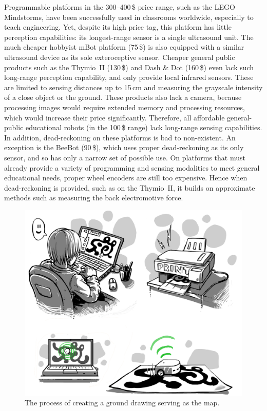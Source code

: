 \documentclass[letterpaper, 10pt, conference]{ieeeconf}
\begin{document}
Programmable platforms in the 300--400\,\$ price range, such as the LEGO Mindstorms, have been successfully used in classrooms worldwide, especially to teach engineering.
Yet, despite its high price tag, this platform has little perception capabilities: its longest-range sensor is a single ultrasound unit.
The much cheaper hobbyist mBot platform (75\,\$) is also equipped with a similar ultrasound device as its sole exteroceptive sensor.
Cheaper general public products such as the Thymio~II (130\,\$) and Dash \& Dot (160\,\$) even lack such long-range perception capability, and only provide local infrared sensors.
These are limited to sensing distances up to 15\,cm and measuring the grayscale intensity of a close object or the ground.
These products also lack a camera, because processing images would require extended memory and processing resources, which would increase their price significantly.
Therefore, all affordable general-public educational robots (in the 100\,\$ range) lack long-range sensing capabilities.
In addition, dead-reckoning on these platforms is bad to non-existent.
An exception is the BeeBot (90\,\$), which uses proper dead-reckoning as its only sensor, and so has only a narrow set of possible use.
On platforms that must already provide a variety of programming and sensing modalities to meet general educational needs, proper wheel encoders are still too expensive.
Hence when dead-reckoning is provided, such as on the Thymio~II, it builds on approximate methods such as measuring the back electromotive force.


\begin{figure}
\includegraphics[width=\columnwidth]{process_creation_col_small}
\caption{The process of creating a ground drawing serving as the map.}
\label{fig:process}
\end{figure}
\end{document}
